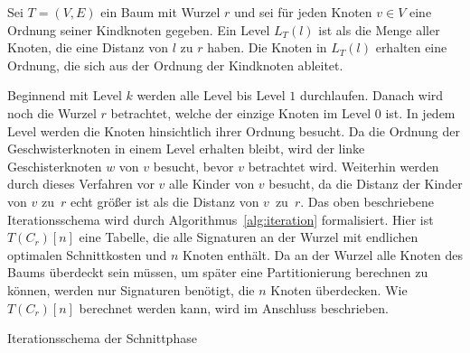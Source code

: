 \begin{defn}[Level]\label{def:level}
    Sei $T = (V,E)$ ein Baum mit Wurzel $r$ und sei für jeden Knoten $v \in V$ eine Ordnung seiner Kindknoten gegeben.
    Ein Level $L_T(l)$ ist als die Menge aller Knoten, die eine Distanz von $l$ zu $r$ haben.
    Die Knoten in $L_T(l)$ erhalten eine Ordnung, die sich aus der Ordnung der Kindknoten ableitet.
\end{defn}

Beginnend mit Level $k$ werden alle Level bis Level $1$ durchlaufen.
Danach wird noch die Wurzel $r$ betrachtet, welche der einzige Knoten im Level $0$ ist. 
In jedem Level werden die Knoten hinsichtlich ihrer Ordnung besucht.
Da die Ordnung der Geschwisterknoten in einem Level erhalten bleibt, wird der linke Geschisterknoten $w$ von $v$ besucht, bevor $v$ betrachtet wird.
Weiterhin werden durch dieses Verfahren vor $v$ alle Kinder von $v$ besucht, da die Distanz der Kinder von $v$ zu~$r$ echt größer ist als die Distanz von $v$~zu~$r$.
Das oben beschriebene Iterationsschema wird durch Algorithmus~\ref{alg:iteration} formalisiert.
Hier ist $T(C_r)[n]$ eine Tabelle, die alle Signaturen an der Wurzel mit endlichen optimalen Schnittkosten und $n$ Knoten enthält.
Da an der Wurzel alle Knoten des Baums überdeckt sein müssen, um später eine Partitionierung berechnen zu können, werden nur Signaturen benötigt, die $n$ Knoten überdecken.
Wie $T(C_r)[n]$ berechnet werden kann, wird im Anschluss beschrieben.

\begin{algorithm}
    \caption{Iterationsschema der Schnittphase}\label{alg:iteration}
    \begin{algorithmic}[1]
             
                 
                    \State {}
                \EndFor
            \EndFor
             
                \State {}
            \EndFor
             
        \EndFunction
    \end{algorithmic}
\end{algorithm}

\newcommand{\canfun}{\textproc{cut\_at\_node}}
\newcommand{\carfun}{\textproc{cut\_at\_root}}

